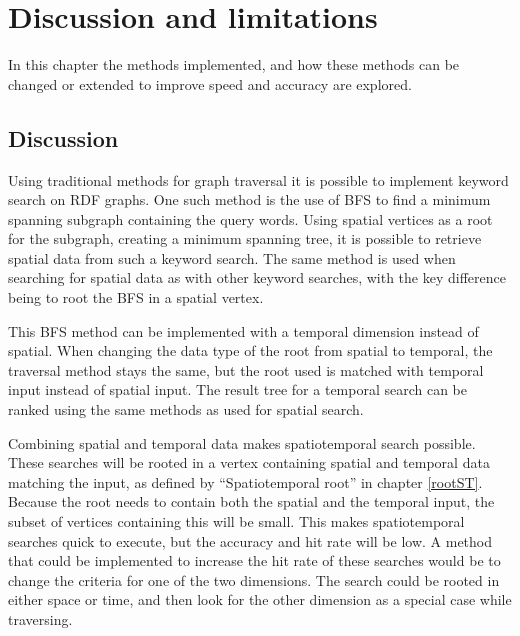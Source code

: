 \chapter{Discussion and limitations}
\label{cha:Discussion}
In this chapter the methods implemented, and how these methods can be changed or extended to improve speed and accuracy are explored.

% 
% 
\section{Discussion}
\label{sec:Discussion}
Using traditional methods for graph traversal it is possible to implement keyword search on RDF graphs. One such method is the use of BFS to find a minimum spanning subgraph containing the query words. Using spatial vertices as a root for the subgraph, creating a minimum spanning tree, it is possible to retrieve spatial data from such a keyword search. The same method is used when searching for spatial data as with other keyword searches, with the key difference being to root the BFS in a spatial vertex.

This BFS method can be implemented with a temporal dimension instead of spatial. When changing the data type of the root from spatial to temporal, the traversal method stays the same, but the root used is matched with temporal input instead of spatial input. The result tree for a temporal search can be ranked using the same methods as used for spatial search.

Combining spatial and temporal data makes spatiotemporal search possible. These searches will be rooted in a vertex containing spatial and temporal data matching the input, as defined by ``Spatiotemporal root'' in chapter \ref{rootST}. Because the root needs to contain both the spatial and the temporal input, the subset of vertices containing this will be small. This makes spatiotemporal searches quick to execute, but the accuracy and hit rate will be low. A method that could be implemented to increase the hit rate of these searches would be to change the criteria for one of the two dimensions. The search could be rooted in either space or time, and then look for the other dimension as a special case while traversing.

